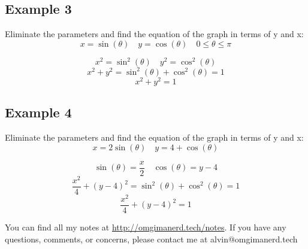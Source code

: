 \documentclass[letterpaper, 12pt]{math}
\begin{document}
\subsection*{Example 3}
Eliminate the parameters and find the equation of the graph in terms of y and x:
\[ x = \sin(\theta) \quad y = \cos(\theta) \quad 0 \leq \theta \leq \pi \]
\begin{center}
\end{center}
\[ x^{2} = \sin^{2}(\theta) \quad y^{2} = \cos^{2}(\theta) \]
\[ x^{2}+y^{2} = \sin^{2}(\theta)+\cos^{2}(\theta) = 1 \]
\[ x^{2}+y^{2} = 1 \]

\subsection*{Example 4}
Eliminate the parameters and find the equation of the graph in terms of y and x:
\[ x = 2\sin(\theta) \quad y = 4+\cos(\theta) \]
\begin{center}
\end{center}
\[ \sin(\theta) = \frac{x}{2} \quad \cos(\theta) = y-4 \]
\[ \frac{x^{2}}{4}+(y-4)^{2} = \sin^{2}(\theta)+\cos^{2}(\theta) = 1 \]
\[ \frac{x^{2}}{4}+(y-4)^{2} = 1 \]

\begin{center}
  You can find all my notes at \url{http://omgimanerd.tech/notes}. If you have
  any questions, comments, or concerns, please contact me at
  alvin@omgimanerd.tech
\end{center}
\end{document}
